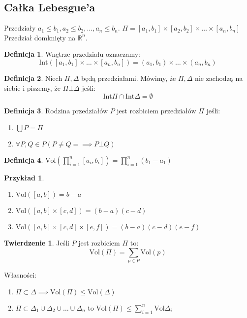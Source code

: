 \documentclass{article}
\theoremstyle{definition}
\newtheorem{de}{Definicja}[subsection]
\theoremstyle{definition}
\newtheorem{tw}{Twierdzenie}[subsection]
\theoremstyle{definition}
\newtheorem{pk}{Przykład}[subsection]
\theoremstyle{definition}
\begin{document}
\subsection{Całka Lebesgue'a}

Przedziały $a_1 \leq b_1, a_2 \leq b_2, \dots, a_n \leq b_n$.
$\Pi = [a_1, b_1] \times [a_2, b_2] \times \dots \times [a_n, b_n]$
Przedział domknięty na $\mathbb{R}^n$. 

\begin{de}
    Wnętrze przedziału oznaczamy:
    \[\text{Int}([a_1,b_1]\times\dots\times[a_n,b_n]) = (a_1,b_1)\times\dots\times(a_n,b_n)\]
\end{de}

\begin{de}
    Niech $\Pi, \Delta$ będą przedziałami. Mówimy, że $\Pi, \Delta$ nie zachodzą na siebie
    i piszemy, że $\Pi \bot \Delta$ jeśli:
        \[\text{Int} \Pi \cap \text{Int} \Delta = \emptyset\]
\end{de}

\begin{de}
    Rodzina przedziałów $P$ jest rozbiciem przedziałów $\Pi$ jeśli:
    \begin{enumerate}
        \item $\bigcup P = \Pi$
        \item $\forall P,Q \in P \left(P\neq Q =\implies P \bot Q \right)$
    \end{enumerate}
\end{de}

\begin{de}
    $\text{Vol}\left(\prod_{i=1}^{n} [a_i,b_i]\right) = \prod_{i=1}^{n} (b_1-a_1)$
\end{de}

\begin{pk}
    \begin{enumerate}
        \item $\text{Vol}([a,b]) = b-a$
        \item $\text{Vol}([a,b]\times[c,d]) = (b-a)(c-d)$
        \item $\text{Vol}([a,b]\times[c,d]\times[e,f]) = (b-a)(c-d)(e-f)$
    \end{enumerate}
\end{pk}

\begin{tw}
    Jeśli $P$ jest rozbiciem $\Pi$ to:
    \[\text{Vol}(\Pi) = \sum_{p\in P} \text{Vol}(p)\]
\end{tw}

Własności:
\begin{enumerate}
    \item $\Pi \subset \Delta \implies \text{Vol}(\Pi) \leq \text{Vol}(\Delta)$
    \item $\Pi \subset \Delta_1 \cup \Delta_2 \cup \dots \cup \Delta_n$
    to $\text{Vol}(\Pi) \leq \sum_{i=1}^{n} \text{Vol}{\Delta_i}$
\end{enumerate}
\end{document}
